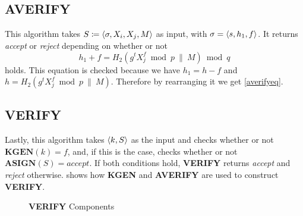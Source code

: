 \subsection{\textbf{AVERIFY}}
  This algorithm takes \(S \coloneqq \langle \sigma, X_i, X_j, M \rangle\) as input, with \(\sigma=\langle s,h_1, f \rangle\).
  It returns \textit{accept} or \textit{reject} depending on whether or not 
    \begin{equation}
      h_1 + f = H_2(g^t X_j^f \bmod p ~\|~ M) \bmod q \label{averifyeq}
    \end{equation}
  holds. 
  This equation is checked because we have \(h_1 = h - f\) and \(h = H_2(g^t X_j^f \bmod p ~\|~ M)\).
  Therefore by rearranging it we get \cref{averifyeq}.

\subsection{\textbf{VERIFY}}
  Lastly, this algorithm takes \(\langle k,S \rangle\) as the input and checks whether or not \(\textbf{KGEN}(k) = f\), and, if this is the case, checks whether or not \(\textbf{ASIGN}(S)=accept\).
  If both conditions hold, \textbf{VERIFY} returns \textit{accept} and \textit{reject} otherwise.
   shows how \textbf{KGEN} and \textbf{AVERIFY} are used to construct \textbf{VERIFY}.

  \begin{figure}[htbp]
    
    \begin{center}
    \end{center}
    
    \caption{\textbf{VERIFY} Components}
    \label{fig:verifycomp}
  \end{figure}
